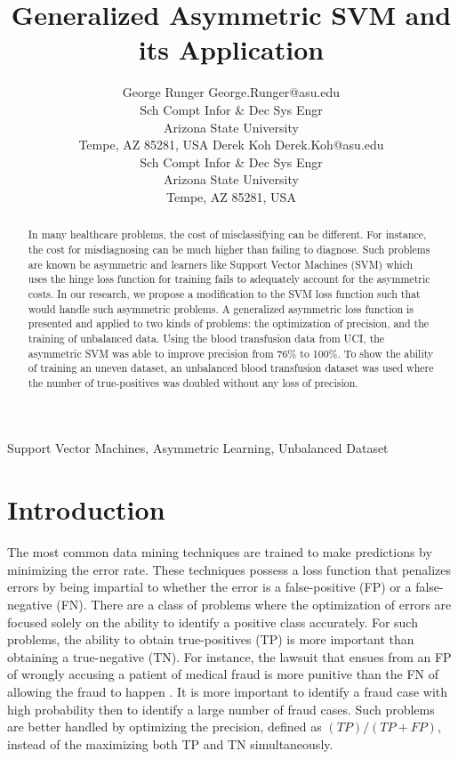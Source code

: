 \documentclass[twoside,11pt]{article}
\title{Generalized Asymmetric SVM and its Application}
\author{\name George Runger \email George.Runger@asu.edu\\
       \addr Sch Compt Infor \& Dec Sys Engr\\
       Arizona State University\\
       Tempe, AZ 85281, USA
       \AND
       \name Derek Koh \email Derek.Koh@asu.edu \\
       \addr Sch Compt Infor \& Dec Sys Engr\\
       Arizona State University\\
       Tempe, AZ 85281, USA}
\begin{document}
\maketitle
\begin{abstract}\label{Abstract}
In many healthcare problems, the cost of misclassifying can be different. For instance, the cost for misdiagnosing can be much higher than failing to diagnose. Such problems are known be asymmetric and learners like Support Vector Machines (SVM) which uses the hinge loss function for training fails to adequately account for the asymmetric costs. In our research, we propose a modification to the SVM loss function such that would handle such asymmetric problems. A generalized asymmetric loss function is presented and applied to two kinds of problems: the optimization of precision, and the training of unbalanced data. Using the blood transfusion data from UCI, the asymmetric SVM was able to improve precision from 76\% to 100\%. To show the ability of training an uneven dataset, an unbalanced blood transfusion dataset was used where the number of true-positives was doubled without any loss of precision.
\end{abstract}

\begin{keywords}
  Support Vector Machines, Asymmetric Learning, Unbalanced Dataset
\end{keywords}

\section{Introduction}\label{Introduction}

The most common data mining techniques are trained to make predictions by minimizing the error rate. These techniques possess a loss function that penalizes errors by being impartial to whether the error is a false-positive (FP) or a false-negative (FN). There are a class of problems where the optimization of errors are focused solely on the ability to identify a positive class accurately. For such problems, the ability to obtain true-positives (TP) is more important than obtaining a true-negative (TN). For instance, the lawsuit that ensues from an FP of wrongly accusing a patient of medical fraud is more punitive than the FN of allowing the fraud to happen \citep{Liou08}. It is more important to identify a fraud case with high probability then to identify a large number of fraud cases. Such problems are better handled by optimizing the precision, defined as $(TP)/(TP+FP)$, instead of the maximizing both TP and TN simultaneously.
\end{document}
